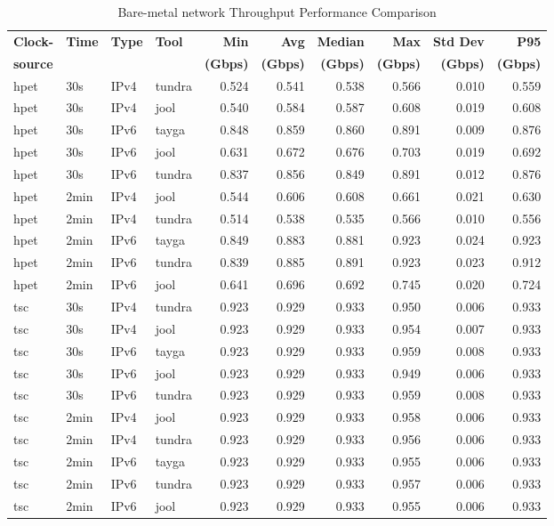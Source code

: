 \begin{table}[htbp]
\centering
\caption{Bare-metal network Throughput Performance Comparison}
\label{tab:throughput_comparison_localdouble}
\footnotesize
\begin{tabular}{|l|l|l|l|r|r|r|r|r|r|}
\hline
\textbf{Clock-} & \textbf{Time} & \textbf{Type} & \textbf{Tool} & \textbf{Min} & \textbf{Avg} & \textbf{Median} & \textbf{Max} & \textbf{Std Dev} & \textbf{P95} \\
\textbf{source} & & & & \textbf{(Gbps)} & \textbf{(Gbps)} & \textbf{(Gbps)} & \textbf{(Gbps)} & \textbf{(Gbps)} & \textbf{(Gbps)} \\
\hline
hpet & 30s & IPv4 & tundra & 0.524 & 0.541 & 0.538 & 0.566 & 0.010 & 0.559 \\
hpet & 30s & IPv4 & jool & 0.540 & 0.584 & 0.587 & 0.608 & 0.019 & 0.608 \\
hpet & 30s & IPv6 & tayga & 0.848 & 0.859 & 0.860 & 0.891 & 0.009 & 0.876 \\
hpet & 30s & IPv6 & jool & 0.631 & 0.672 & 0.676 & 0.703 & 0.019 & 0.692 \\
hpet & 30s & IPv6 & tundra & 0.837 & 0.856 & 0.849 & 0.891 & 0.012 & 0.876 \\
hpet & 2min & IPv4 & jool & 0.544 & 0.606 & 0.608 & 0.661 & 0.021 & 0.630 \\
hpet & 2min & IPv4 & tundra & 0.514 & 0.538 & 0.535 & 0.566 & 0.010 & 0.556 \\
hpet & 2min & IPv6 & tayga & 0.849 & 0.883 & 0.881 & 0.923 & 0.024 & 0.923 \\
hpet & 2min & IPv6 & tundra & 0.839 & 0.885 & 0.891 & 0.923 & 0.023 & 0.912 \\
hpet & 2min & IPv6 & jool & 0.641 & 0.696 & 0.692 & 0.745 & 0.020 & 0.724 \\
\hline
tsc & 30s & IPv4 & tundra & 0.923 & 0.929 & 0.933 & 0.950 & 0.006 & 0.933 \\
tsc & 30s & IPv4 & jool & 0.923 & 0.929 & 0.933 & 0.954 & 0.007 & 0.933 \\
tsc & 30s & IPv6 & tayga & 0.923 & 0.929 & 0.933 & 0.959 & 0.008 & 0.933 \\
tsc & 30s & IPv6 & jool & 0.923 & 0.929 & 0.933 & 0.949 & 0.006 & 0.933 \\
tsc & 30s & IPv6 & tundra & 0.923 & 0.929 & 0.933 & 0.959 & 0.008 & 0.933 \\
tsc & 2min & IPv4 & jool & 0.923 & 0.929 & 0.933 & 0.958 & 0.006 & 0.933 \\
tsc & 2min & IPv4 & tundra & 0.923 & 0.929 & 0.933 & 0.956 & 0.006 & 0.933 \\
tsc & 2min & IPv6 & tayga & 0.923 & 0.929 & 0.933 & 0.955 & 0.006 & 0.933 \\
tsc & 2min & IPv6 & tundra & 0.923 & 0.929 & 0.933 & 0.957 & 0.006 & 0.933 \\
tsc & 2min & IPv6 & jool & 0.923 & 0.929 & 0.933 & 0.955 & 0.006 & 0.933 \\
\hline
\end{tabular}
\end{table}

